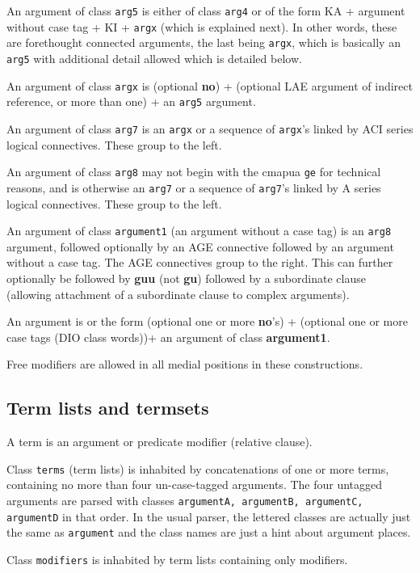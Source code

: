 \documentclass[12pt]{book}
\begin{document}
An argument of class {\tt arg5} is either of class {\tt arg4} or of the form KA + argument without case tag + KI + {\tt argx} (which is explained next).  In other words, these are forethought connected arguments, the last being {\tt argx}, which is basically an {\tt arg5} with additional detail allowed which is detailed below.

An argument of class {\tt argx} is (optional {\bf no}) + (optional LAE argument of indirect reference, or more than one) + an {\tt arg5} argument.

An argument of class {\tt arg7} is an {\tt argx} or a sequence of {\tt argx}'s linked by ACI series logical connectives.  These group to the left.

An argument of class {\tt arg8} may not begin with the cmapua {\tt ge} for technical reasons, and is otherwise an {\tt arg7} or a sequence
of {\tt arg7}'s linked by A series logical connectives.  These group to the left.

An argument of class {\tt argument1} (an argument without a case tag) is an {\tt arg8} argument, followed optionally by an AGE connective followed by an argument without a case tag.  The AGE connectives group to the right.  This can further optionally be followed by {\bf guu} (not {\bf gu}) followed by a subordinate clause (allowing attachment of a subordinate clause to complex arguments).  

An argument is or the form (optional one or more {\bf no}'s) + (optional one or more case tags (DIO class words))+ an argument of class {\bf argument1}.

Free modifiers are allowed in all medial positions in these constructions.

\subsection{Term lists and termsets}

A term is an argument or predicate modifier (relative clause).

Class {\tt terms} (term lists) is inhabited by concatenations of one or more terms, containing no more than four
un-case-tagged arguments.  The four untagged arguments are parsed with 
classes {\tt argumentA, argumentB, argumentC, argumentD} in that order.  In the usual parser, the lettered classes are actually just the same as {\tt argument} and the class names are just a hint about argument places.  

Class {\tt modifiers} is inhabited by term lists containing only modifiers.
\end{document}
